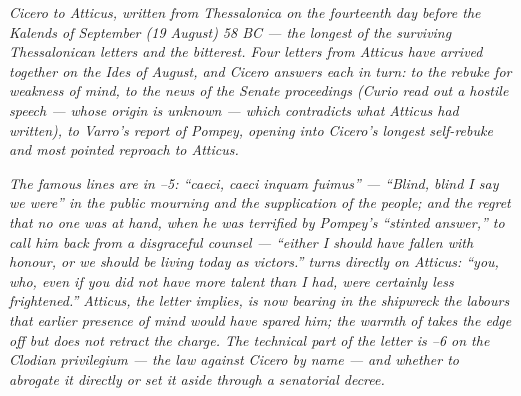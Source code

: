 
\textit{Cicero to Atticus, written from Thessalonica on the
fourteenth day before the Kalends of September (19 August)
58 BC --- the longest of the surviving Thessalonican letters
and the bitterest. Four letters from Atticus have arrived
together on the Ides of August, and Cicero answers each in
turn:  to the rebuke for weakness of mind,
 to the news of the Senate proceedings (Curio
read out a hostile speech --- whose origin is unknown ---
which contradicts what Atticus had written), 
to Varro's report of Pompey, opening into Cicero's longest
self-rebuke and most pointed reproach to Atticus.}

\textit{The famous lines are in --5: ``\textit{caeci,
caeci inquam fuimus}'' --- ``Blind, blind I say we were'' in
the public mourning and the supplication of the people; and
the regret that no one was at hand, when he was terrified by
Pompey's ``stinted answer,'' to call him back from a
disgraceful counsel --- ``either I should have fallen with
honour, or we should be living today as victors.''
 turns directly on Atticus: ``you, who, even if
you did not have more talent than I had, were certainly less
frightened.'' Atticus, the letter implies, is now bearing in
the shipwreck the labours that earlier presence of mind would
have spared him; the warmth of  takes the edge
off but does not retract the charge. The technical part of
the letter is --6 on the Clodian
\textit{privilegium} --- the law against Cicero by name ---
and whether to abrogate it directly or set it aside through
a senatorial decree.}
